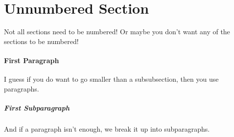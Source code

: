 \documentclass{report}
\begin{document}
\section*{Unnumbered Section}

Not all sections need to be numbered! Or maybe you don't want any of the sections to be numbered!

\paragraph{First Paragraph} 

I guess if you do want to go smaller than a subsubsection, then you use paragraphs. 

\subparagraph{First Subparagraph}

And if a paragraph isn't enough, we break it up into subparagraphs.
\end{document}
